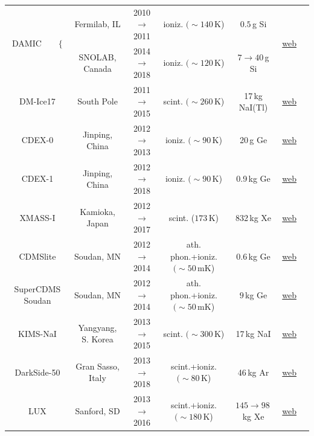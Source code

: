 \begin{table}[p]
\begin{center}
{\begin{tabular}{ccccccc}
\multirow{2}{*}{{\sc DAMIC}~~~~$\Big\{$} & Fermilab, IL & 2010 $\to$ 2011 &   ioniz. $(\sim140\,$K) & $0.5$\,g Si &  \multirow{2}{*}{\href{http://damic.uchicago.edu}{web}} & \multirow{2}{*}{\cite{DAMIC}} \\
 & SNOLAB, Canada & 2014 $\to$ 2018  &  ioniz. $(\sim120\,$K)& $7\to40\,$g Si &   &  \\
 
 {\sc DM-Ice17} & South Pole & 2011 $\to$ 2015 &   scint.  $(\sim 260\,$K) & 17\,kg NaI(Tl) &  \href{http://dm-ice.yale.edu/home}{web} & \cite{1602.05939} \\
 
  {\sc CDEX-0} & Jinping, China & 2012 $\to$ 2013 &  ioniz. $(\sim90\,$K) & 20\,g Ge &  \href{http://cdex.ep.tsinghua.edu.cn}{web} & \cite{CDEX-0}
\\
 
 {\sc CDEX-1} & Jinping, China & 2012 $\to$ 2018 &  ioniz. $(\sim90\,$K) & 0.9\,kg Ge &  \href{http://cdex.ep.tsinghua.edu.cn}{web} & \cite{CDEX-1}
\\

{\sc XMASS-I} & Kamioka, Japan & 2012 $\to$ 2017 &  scint. ($173\,$K) & 832\,kg Xe & \href{http://www-sk.icrr.u-tokyo.ac.jp/xmass/index-e.html}{web} & \cite{XMASS-I}
\\

{\sc CDMSlite} & Soudan, MN & 2012 $\to$ 2014 & ath. phon.+ioniz. $(\sim50\,$mK)& $0.6\,$kg Ge & \href{https://supercdms.slac.stanford.edu}{web} & \cite{CDMSlite} \\

{\sc SuperCDMS Soudan} & Soudan, MN & 2012 $\to$ 2014 & ath. phon.+ioniz. $(\sim50\,$mK) & $9\,$kg Ge & \href{https://supercdms.slac.stanford.edu}{web} & \cite{SuperCDMS}
\\

{\sc KIMS-NaI} & Yangyang, S. Korea & 2013 $\to$ 2015 &  scint. $(\sim300\,$K)  &  17\,kg NaI & \href{https://web.archive.org/web/20200218154113/http://q2c.snu.ac.kr/KIMS/KIMS_index.htm}{web} & \cite{KIMS-NaI} \\

{\sc DarkSide-50} & Gran Sasso, Italy & 2013 $\to$ 2018 &  scint.+ioniz. $(\sim80\,$K)  &  46\,kg Ar & \href{http://darkside.lngs.infn.it}{web} & \cite{DarkSide-50} \\

{\sc LUX} & Sanford, SD & 2013 $\to$ 2016 &  scint.+ioniz. $(\sim180\,$K)  & $145\to98\,$kg Xe & \href{https://sites.brown.edu/luxdarkmatter/}{web} & \cite{LUX}
 \\
 

\end{tabular}}
\end{center}
\end{table}

